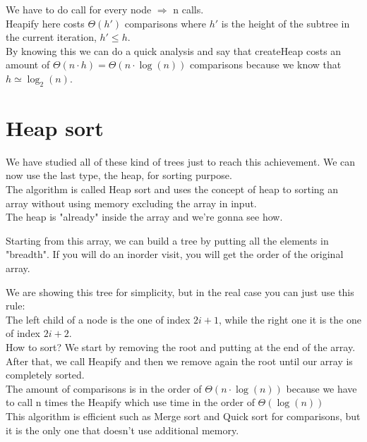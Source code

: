 \documentclass{article}
\begin{document}
We have to do call for every node $\Rightarrow$ n calls.\\
Heapify here costs $\Theta(h')$ comparisons where $h'$ is the height of the subtree in the current iteration, $h' \leq h$.\\
By knowing this we can do a quick analysis and say that createHeap costs an amount of $\Theta(n\cdot h)=\Theta(n\cdot \log(n))$ comparisons because we know that $h\simeq \log_2(n)$.

\section{Heap sort}
We have studied all of these kind of trees just to reach this achievement. We can now use the last type, the heap, for sorting purpose.\\
The algorithm is called Heap sort and uses the concept of heap to sorting an array without using memory excluding the array in input.\\
The heap is "already" inside the array and we're gonna see how.\\


Starting from this array, we can build a tree by putting all the elements in "breadth". If you will do an inorder visit, you will get the order of the original array.\\ 

We are showing this tree for simplicity, but in the real case you can just use this rule: \\
The left child of a node is the one of index $2i+1$, while the right one it is the one of index $2i+2$.\\
How to sort? We start by removing the root and putting at the end of the array. After that, we call Heapify and then we remove again the root until our array is completely sorted.\\
The amount of comparisons is in the order of $\Theta(n\cdot \log(n))$ because we have to call n times the Heapify which use time in the order of $\Theta(\log(n))$\\
This algorithm is efficient such as Merge sort and Quick sort for comparisons, but it is the only one that doesn't use additional memory.\\
\end{document}
